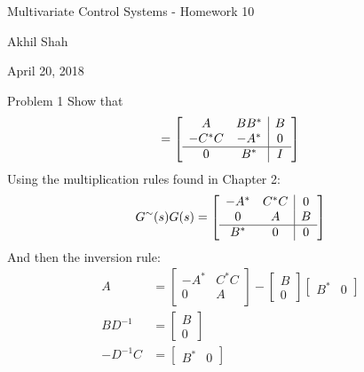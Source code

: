 \documentclass{article}
\begin{document}
\begin{center}
    {\huge Multivariate Control Systems - Homework 10}
\end{center}
\begin{center}
    Akhil Shah
\end{center}
\begin{center}
    April 20, 2018
\end{center}

\noindent
{\large Problem 1}
\newline
\newline
Show that 
\begin{equation}
    [I - G^{\sim}(s)G(s)] = \left[ \begin{array}{cc | c}
                           A & BB^{*} & B \\
                           -C^{*}C & -A^{*} & 0 \\
                           \hline
                           0 & B^{*} & I\\
                           \end{array} \right]
\end{equation}
Using the multiplication rules found in Chapter 2:
\begin{equation}
    G^{\sim}(s)G(s) = \left[ \begin{array}{cc | c}
                     -A^{*} & C^{*}C & 0 \\
                     0 & A & B \\
                     \hline
                     B^{*} & 0  & 0\\
                     \end{array} \right]
\end{equation}
And then the inversion rule:
\begin{align}
    A &= \begin{bmatrix} -A^{*} & C^{*}C \\
                        0 & A \\
        \end{bmatrix} - \begin{bmatrix} B \\ 0 \end{bmatrix} \begin{bmatrix} B^{*} & 0 \end{bmatrix} \\
    BD^{-1} &= \begin{bmatrix} B \\ 0 \end{bmatrix} \\
    -D^{-1}C &= \begin{bmatrix} B^* & 0 \end{bmatrix}
\end{align}
\end{document}
